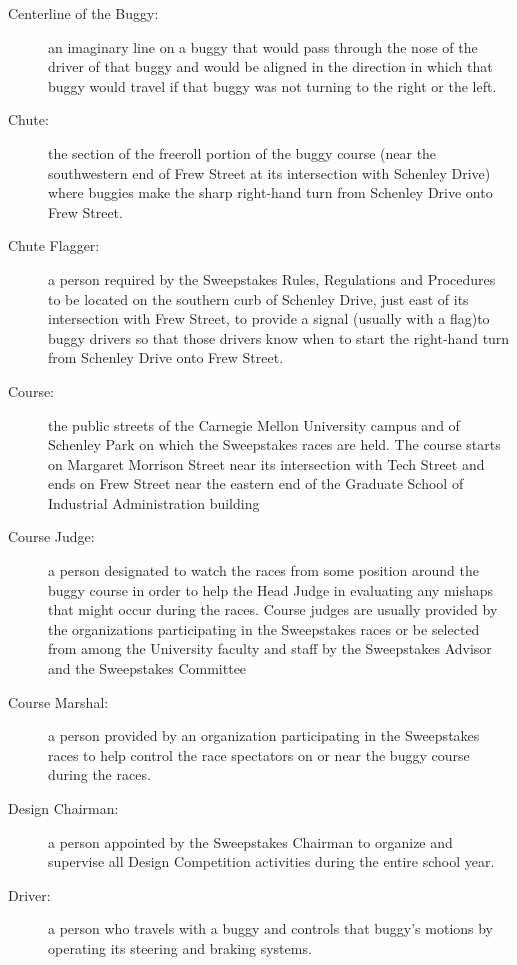 \begin{description}
	\item[Centerline of the Buggy:]
	an imaginary line on a buggy that would pass through the nose of the driver of that buggy and would be aligned in the direction in which that buggy would travel if that buggy was not turning to the right or the left.

	\item[Chute:]
	the section of the freeroll portion of the buggy course (near the southwestern end of Frew Street at its intersection with Schenley Drive) where buggies make the sharp right-hand turn from Schenley Drive onto Frew Street.

	\item[Chute Flagger:]
	a person required by the Sweepstakes Rules, Regulations and Procedures to be located on the southern curb of Schenley Drive, just east of its intersection with Frew Street, to provide a signal (usually with a flag)to buggy drivers so that those drivers know when to start the right-hand turn from Schenley Drive onto Frew Street.

	\item[Course:]
	the public streets of the Carnegie Mellon University campus and of Schenley Park on which the Sweepstakes races are held. The course starts on Margaret Morrison Street near its intersection with Tech Street and ends on Frew Street near the eastern end of the Graduate School of Industrial Administration building

	\item[Course Judge:]
	a person designated to watch the races from some position around the buggy course in order to help the Head Judge in evaluating any mishaps that might occur during the races. Course judges are usually provided by the organizations participating in the Sweepstakes races or be selected from among the University faculty and staff by the Sweepstakes Advisor and the Sweepstakes Committee

	\item[Course Marshal:]
	a person provided by an organization participating in the Sweepstakes races to help control the race spectators on or near the buggy course during the races.

	\item[Design Chairman:]
	a person appointed by the Sweepstakes Chairman to organize and supervise all Design Competition activities during the entire school year.

	\item[Driver:]
	a person who travels with a buggy and controls that buggy's motions by operating its steering and braking systems.


\end{description}
